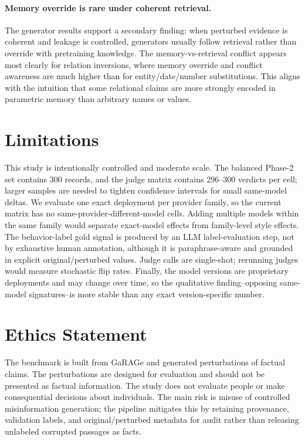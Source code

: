 \documentclass[11pt]{article}
\begin{document}
\paragraph{Memory override is rare under coherent retrieval.}
The generator results support a secondary finding: when perturbed evidence is coherent and leakage is controlled, generators usually follow retrieval rather than override with pretraining knowledge. The memory-vs-retrieval conflict appears most clearly for relation inversions, where memory override and conflict awareness are much higher than for entity/date/number substitutions. This aligns with the intuition that some relational claims are more strongly encoded in parametric memory than arbitrary names or values.

\section*{Limitations}

This study is intentionally controlled and moderate scale. The balanced Phase-2 set contains 300 records, and the judge matrix contains 296--300 verdicts per cell; larger samples are needed to tighten confidence intervals for small same-model deltas. We evaluate one exact deployment per provider family, so the current matrix has no same-provider-different-model cells. Adding multiple models within the same family would separate exact-model effects from family-level style effects. The behavior-label gold signal is produced by an LLM label-evaluation step, not by exhaustive human annotation, although it is paraphrase-aware and grounded in explicit original/perturbed values. Judge calls are single-shot; rerunning judges would measure stochastic flip rates. Finally, the model versions are proprietary deployments and may change over time, so the qualitative finding--opposing same-model signatures--is more stable than any exact version-specific number.

\section*{Ethics Statement}

The benchmark is built from GaRAGe and generated perturbations of factual claims. The perturbations are designed for evaluation and should not be presented as factual information. The study does not evaluate people or make consequential decisions about individuals. The main risk is misuse of controlled misinformation generation; the pipeline mitigates this by retaining provenance, validation labels, and original/perturbed metadata for audit rather than releasing unlabeled corrupted passages as facts.
\end{document}
